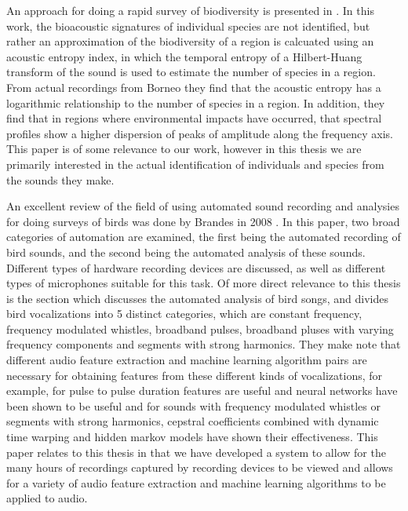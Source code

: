 An approach for doing a rapid survey of biodiversity is presented in
\cite{sueur08}.  In this work, the bioacoustic signatures of
individual species are not identified, but rather an approximation of
the biodiversity of a region is calcuated using an acoustic entropy
index, in which the temporal entropy of a Hilbert-Huang transform of
the sound is used to estimate the number of species in a region.  From
actual recordings from Borneo they find that the acoustic entropy has
a logarithmic relationship to the number of species in a region.  In
addition, they find that in regions where environmental impacts have
occurred, that spectral profiles show a higher dispersion of peaks of
amplitude along the frequency axis.  This paper is of some relevance
to our work, however in this thesis we are primarily interested in the
actual identification of individuals and species from the sounds they
make.

An excellent review of the field of using automated sound recording
and analysies for doing surveys of birds was done by Brandes in 2008
\cite{brandes08}.  In this paper, two broad categories of automation
are examined, the first being the automated recording of bird sounds,
and the second being the automated analysis of these sounds.
Different types of hardware recording devices are discussed, as well
as different types of microphones suitable for this task.  Of more
direct relevance to this thesis is the section which discusses the
automated analysis of bird songs, and divides bird vocalizations into
5 distinct categories, which are constant frequency, frequency
modulated whistles, broadband pulses, broadband pluses with varying
frequency components and segments with strong harmonics.  They make
note that different audio feature extraction and machine learning
algorithm pairs are necessary for obtaining features from these
different kinds of vocalizations, for example, for pulse to pulse
duration features are useful and neural networks have been shown to be
useful and for sounds with frequency modulated whistles or segments
with strong harmonics, cepstral coefficients combined with dynamic
time warping and hidden markov models have shown their effectiveness.
This paper relates to this thesis in that we have developed a system
to allow for the many hours of recordings captured by recording
devices to be viewed and allows for a variety of audio feature
extraction and machine learning algorithms to be applied to audio.


